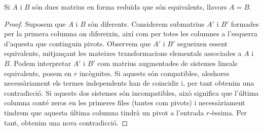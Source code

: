 \begin{proposicio}
	Si $A$ i $B$ són dues matrius en forma reduïda que són equivalents, llavors $A=B$. %
\end{proposicio}
\begin{proof}
	Suposem que $A$ i $B$ són diferents. Considerem submatrius $A'$ i $B'$ formades per la primera columna on difereixin, així com per totes les columnes a l'esquerra d'aquesta que continguin pivots. Observem que $A'$ i $B'$ segueixen essent equivalents, mitjançant les mateixes transformacions elementals associades a $A$ i $B$. Podem interpretar $A'$ i $B'$ com matrius augmentades de sistemes lineals equivalents, posem en $r$ incògnites. Si aquests són compatibles, aleshores necessàriament els termes independents han de coincidir i, per tant obtenim una contradicció. Si aquests dos sistemes són incompatibles, això significa que l'última columna conté zeros en les primeres files (tantes com pivots) i necessàriament tindrem que aquesta última columna tindrà un pivot a l'entrada $r$-èssima. Per tant, obtenim una nova contradicció.
\end{proof}
%
%



